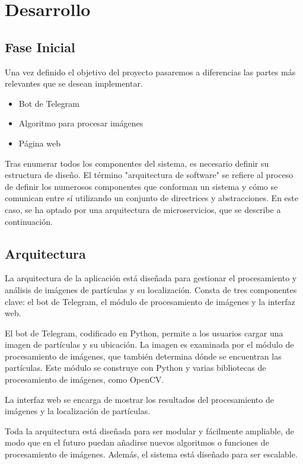 \chapter{Desarrollo}\label{int}
\thispagestyle{fancy}

\section{Fase Inicial}
Una vez definido el objetivo del proyecto pasaremos a diferencias las partes más relevantes que se desean implementar.
\begin{itemize}
    \item Bot de Telegram
    \item Algoritmo para procesar imágenes
    \item Página web
\end{itemize}
Tras enumerar todos los componentes del sistema, es necesario definir su estructura de diseño. El término "arquitectura de software" se refiere al proceso de definir los numerosos componentes que conforman un sistema y cómo se comunican entre sí utilizando un conjunto de directrices y abstracciones. En este caso, se ha optado por una arquitectura de microservicios, que se describe a continuación.
\section{Arquitectura}

La arquitectura de la aplicación está diseñada para gestionar el procesamiento y análisis de imágenes de partículas y su localización. Consta de tres componentes clave: el bot de Telegram, el módulo de procesamiento de imágenes y la interfaz web.

El bot de Telegram, codificado en Python, permite a los usuarios cargar una imagen de partículas y su ubicación. La imagen es examinada por el módulo de procesamiento de imágenes, que también determina dónde se encuentran las partículas. Este módulo se construye con Python y varias bibliotecas de procesamiento de imágenes, como OpenCV.

La interfaz web se encarga de mostrar los resultados del procesamiento de imágenes y la localización de partículas. 

Toda la arquitectura está diseñada para ser modular y fácilmente ampliable, de modo que en el futuro puedan añadirse nuevos algoritmos o funciones de procesamiento de imágenes. Además, el sistema está diseñado para ser escalable.

